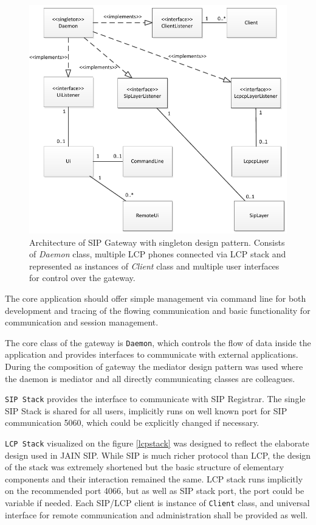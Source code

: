 \begin{figure}[h!]
\centering
\includegraphics[width=15cm]{fig/sipgw.pdf}
\caption[SIP gateway design]{Architecture of SIP Gateway with singleton design 
pattern. Consists of \textit{Daemon} class, multiple LCP phones connected via 
LCP stack and represented as instances of \textit{Client} class and multiple 
user interfaces for control over the gateway.}
\label{gw}
\end{figure}

The core application should offer simple management via command line for 
both development and tracing of the flowing communication and basic 
functionality for communication and session management. 

The core class of the gateway is \texttt{Daemon}, which controls the flow of 
data inside the application and provides interfaces to communicate with external 
applications. During the composition of gateway the mediator design pattern
was used where the daemon is mediator and all directly communicating classes are
colleagues.
 
\texttt{SIP Stack} provides the interface to communicate with SIP Registrar. 
The single SIP Stack is shared for all users, implicitly runs on well known port
for SIP communication 5060, which could be explicitly changed if necessary.

\texttt{LCP Stack} visualized on the figure \ref{lcpstack} was designed to 
reflect the elaborate design used in JAIN SIP\cite{jainsip}. While SIP is much 
richer protocol than LCP, the design of the stack was extremely shortened but 
the basic structure of elementary components and their interaction remained the 
same. LCP stack runs implicitly on the recommended port 4066, but as well as SIP 
stack port, the port could be variable if needed. Each SIP/LCP client is 
instance of \texttt{Client} class, and universal interface for remote 
communication and administration shall be provided as well.

